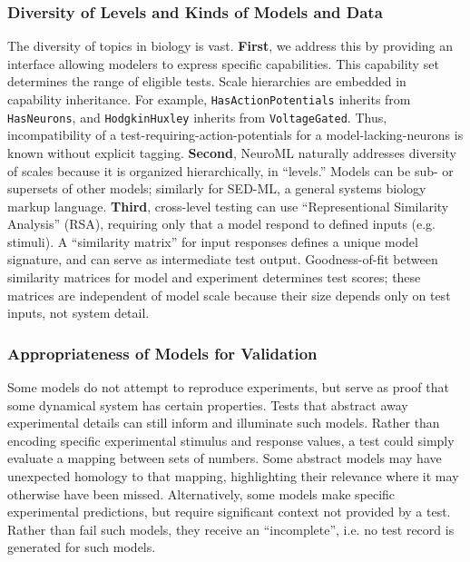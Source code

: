 \documentclass[11pt,letterpaper]{article}
\let\verbx\lstinline
\begin{document}
\subsubsection{Diversity of Levels and Kinds of Models and Data}
The diversity of topics in biology is vast. \textbf{First}, we address this by providing an interface allowing modelers to express specific capabilities.  This capability set determines the range of eligible tests.  Scale hierarchies are embedded in capability inheritance.  For example, \verbx{HasActionPotentials} inherits from \verbx{HasNeurons}, and \verbx{HodgkinHuxley} inherits from \verbx{VoltageGated}. Thus, incompatibility of a test-requiring-action-potentials for a model-lacking-neurons is known without explicit tagging. \textbf{Second}, NeuroML naturally addresses diversity of scales because it is organized hierarchically, in ``levels.''  Models can be sub- or supersets of other models; similarly for SED-ML\cite{sedml_url,hucka_systems_2003}, a general systems biology markup language. \textbf{Third}, cross-level testing can use ``Representional Similarity Analysis'' (RSA)\cite{kriegeskorte_representational_2008}, requiring only that a model respond to defined inputs (e.g. stimuli).  A ``similarity matrix'' for input responses defines a unique model signature, and can serve as intermediate test output.  Goodness-of-fit between similarity matrices for model and experiment determines test scores; these matrices are independent of model scale because their size depends only on test inputs, not system detail.  

\subsubsection{Appropriateness of Models for Validation}
Some models do not attempt to reproduce experiments, but serve as proof that some dynamical system has certain properties.  Tests that abstract away experimental details can still inform and illuminate such models.  Rather than encoding specific experimental stimulus and response values, a test could simply evaluate a mapping between sets of numbers.  Some abstract models may have unexpected homology to that mapping, highlighting their relevance where it may otherwise have been missed.  Alternatively, some models make specific experimental predictions, but require significant context not provided by a test.  Rather than fail such models, they receive an ``incomplete'', i.e. no test record is generated for such models.  
\end{document}
